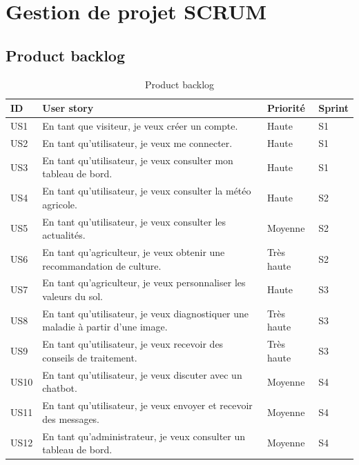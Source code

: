 \section{Gestion de projet SCRUM}
\subsection{Product backlog}
\begin{longtable}{p{1.2cm}p{8.5cm}p{2cm}p{2cm}}
\caption{Product backlog}\\
\toprule
\textbf{ID} & \textbf{User story} & \textbf{Priorité} & \textbf{Sprint} \\
\midrule
US1 & En tant que visiteur, je veux créer un compte. & Haute & S1 \\
US2 & En tant qu'utilisateur, je veux me connecter. & Haute & S1 \\
US3 & En tant qu'utilisateur, je veux consulter mon tableau de bord. & Haute & S1 \\
US4 & En tant qu'utilisateur, je veux consulter la météo agricole. & Haute & S2 \\
US5 & En tant qu'utilisateur, je veux consulter les actualités. & Moyenne & S2 \\
US6 & En tant qu'agriculteur, je veux obtenir une recommandation de culture. & Très haute & S2 \\
US7 & En tant qu'agriculteur, je veux personnaliser les valeurs du sol. & Haute & S3 \\
US8 & En tant qu'utilisateur, je veux diagnostiquer une maladie à partir d'une image. & Très haute & S3 \\
US9 & En tant qu'utilisateur, je veux recevoir des conseils de traitement. & Très haute & S3 \\
US10 & En tant qu'utilisateur, je veux discuter avec un chatbot. & Moyenne & S4 \\
US11 & En tant qu'utilisateur, je veux envoyer et recevoir des messages. & Moyenne & S4 \\
US12 & En tant qu'administrateur, je veux consulter un tableau de bord. & Moyenne & S4 \\
\bottomrule
\end{longtable}

